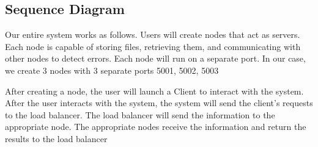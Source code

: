 \documentclass[a4paper,12pt]{article}
\begin{document}
\subsection{Sequence Diagram}
Our entire system works as follows. Users will create nodes that act as servers. Each node is capable of storing files, retrieving them, and communicating with other nodes to detect errors. Each node will run on a separate port. In our case, we create 3 nodes with 3 separate ports 5001, 5002, 5003

After creating a node, the user will launch a Client to interact with the system. After the user interacts with the system, the system will send the client's requests to the load balancer. The load balancer will send the information to the appropriate node. The appropriate nodes receive the information and return the results to the load balancer
\end{document}
